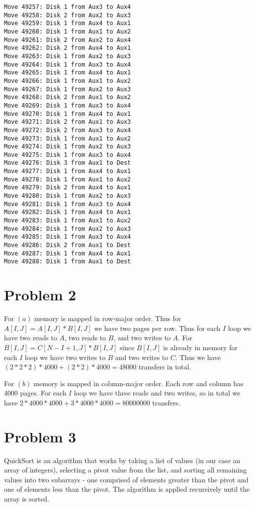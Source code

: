 \documentclass[11pt]{article}
\begin{document}
\begin{multicols}{2}
\begin{Verbatim}[fontsize=\small]
Move 49257: Disk 1 from Aux3 to Aux4
Move 49258: Disk 2 from Aux2 to Aux3
Move 49259: Disk 1 from Aux4 to Aux1
Move 49260: Disk 1 from Aux1 to Aux2
Move 49261: Disk 2 from Aux2 to Aux4
Move 49262: Disk 2 from Aux4 to Aux1
Move 49263: Disk 1 from Aux2 to Aux3
Move 49264: Disk 1 from Aux3 to Aux4
Move 49265: Disk 1 from Aux4 to Aux1
Move 49266: Disk 1 from Aux1 to Aux2
Move 49267: Disk 1 from Aux2 to Aux3
Move 49268: Disk 2 from Aux1 to Aux2
Move 49269: Disk 1 from Aux3 to Aux4
Move 49270: Disk 1 from Aux4 to Aux1
Move 49271: Disk 2 from Aux1 to Aux3
Move 49272: Disk 2 from Aux3 to Aux4
Move 49273: Disk 1 from Aux1 to Aux2
Move 49274: Disk 1 from Aux2 to Aux3
Move 49275: Disk 1 from Aux3 to Aux4
Move 49276: Disk 3 from Aux1 to Dest
Move 49277: Disk 1 from Aux4 to Aux1
Move 49278: Disk 1 from Aux1 to Aux2
Move 49279: Disk 2 from Aux4 to Aux1
Move 49280: Disk 1 from Aux2 to Aux3
Move 49281: Disk 1 from Aux3 to Aux4
Move 49282: Disk 1 from Aux4 to Aux1
Move 49283: Disk 1 from Aux1 to Aux2
Move 49284: Disk 1 from Aux2 to Aux3
Move 49285: Disk 1 from Aux3 to Aux4
Move 49286: Disk 2 from Aux1 to Dest
Move 49287: Disk 1 from Aux4 to Aux1
Move 49288: Disk 1 from Aux1 to Dest
\end{Verbatim}

\end{multicols}

\section*{Problem 2}

For $(a)$ memory is mapped in row-major order. Thus for $A[I,J] = A[I,J]* B[I,J]$ we have two pages per row. Thus for each $I$ loop we have two reads to $A$, two reads to $B$, and two writes to $A$. For $B[I,J] = C[N-I+1,J] * B[I,J]$ since $B[I,J]$ is already in memory for each $I$ loop we have two writes to $B$ and two writes to $C$. Thus we have $(2*2*2)*4000 + (2*2)*4000 = 48000$ transfers in total.

For $(b)$ memory is mapped in column-major order. Each row and column has 4000 pages. For each $I$ loop we have three reads and two writes, so in total we have $2*4000*4000 + 3*4000*4000 = 80000000$ transfers.

\section*{Problem 3}

QuickSort is an algorithm that works by taking a list of values (in our case an array of integers), selecting a pivot value from the list, and sorting all remaining values into two subarrays - one comprised of elements greater than the pivot and one of elements less than the pivot. The algorithm is applied recursively until the array is sorted.
\end{document}
